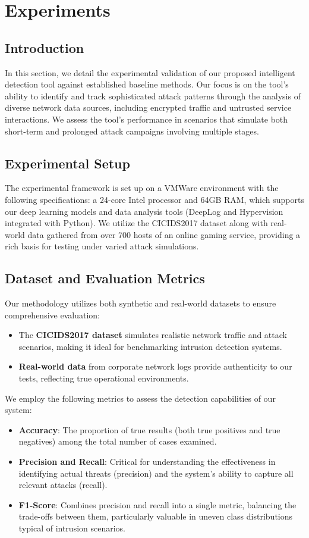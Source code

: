\section{Experiments}\label{sec:exps}
\subsection{Introduction}\label{sec:intro-experiments}
In this section, we detail the experimental validation of our proposed intelligent detection tool against established baseline methods. Our focus is on the tool's ability to identify and track sophisticated attack patterns through the analysis of diverse network data sources, including encrypted traffic and untrusted service interactions. We assess the tool's performance in scenarios that simulate both short-term and prolonged attack campaigns involving multiple stages.

\subsection{Experimental Setup}\label{sec:experimental-setup}
The experimental framework is set up on a VMWare environment with the following specifications: a 24-core Intel processor and 64GB RAM, which supports our deep learning models and data analysis tools (DeepLog and Hypervision integrated with Python). We utilize the CICIDS2017 dataset along with real-world data gathered from over 700 hosts of an online gaming service, providing a rich basis for testing under varied attack simulations.

\subsection{Dataset and Evaluation Metrics}\label{sec:env}
Our methodology utilizes both synthetic and real-world datasets to ensure comprehensive evaluation:
\begin{itemize}
    \item The \textbf{CICIDS2017 dataset} simulates realistic network traffic and attack scenarios, making it ideal for benchmarking intrusion detection systems.
    \item \textbf{Real-world data} from corporate network logs provide authenticity to our tests, reflecting true operational environments.
\end{itemize}

We employ the following metrics to assess the detection capabilities of our system:
\begin{itemize}
    \item \textbf{Accuracy}: The proportion of true results (both true positives and true negatives) among the total number of cases examined.
    \item \textbf{Precision and Recall}: Critical for understanding the effectiveness in identifying actual threats (precision) and the system's ability to capture all relevant attacks (recall).
    \item \textbf{F1-Score}: Combines precision and recall into a single metric, balancing the trade-offs between them, particularly valuable in uneven class distributions typical of intrusion scenarios.
\end{itemize}

